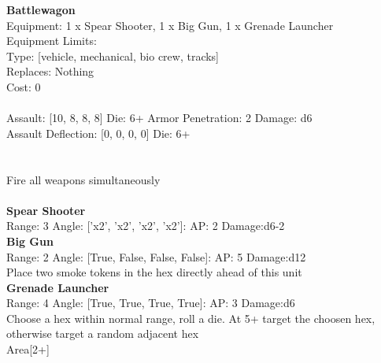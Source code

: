 {\bf Battlewagon } \\
Equipment: 1 x Spear Shooter, 1 x Big Gun, 1 x Grenade Launcher \\
Equipment Limits:  \\
Type: [vehicle, mechanical, bio crew, tracks] \\
Replaces: Nothing \\
Cost: 0\\
\ \\
Assault: [10, 8, 8, 8] Die: 6+ Armor Penetration: 2 Damage: d6 \\
Assault Deflection: [0, 0, 0, 0] Die: 6+\\
\\ 
 
\ \\
Fire all weapons simultaneously\\ 

\ \\
{\bf Spear Shooter } \\



Range: 3  Angle: ['x2', 'x2', 'x2', 'x2']: AP: 2 Damage:d6-2 \\




{\bf Big Gun } \\



Range: 2  Angle: [True, False, False, False]: AP: 5 Damage:d12 \\
Place two smoke tokens in the hex directly ahead of this unit\\ 




{\bf Grenade Launcher } \\



Range: 4  Angle: [True, True, True, True]: AP: 3 Damage:d6 \\
Choose a hex within normal range, roll a die. At 5+ target the choosen hex, otherwise target a random adjacent hex\\ 
Area[2+]\\ 




 
\ \\



